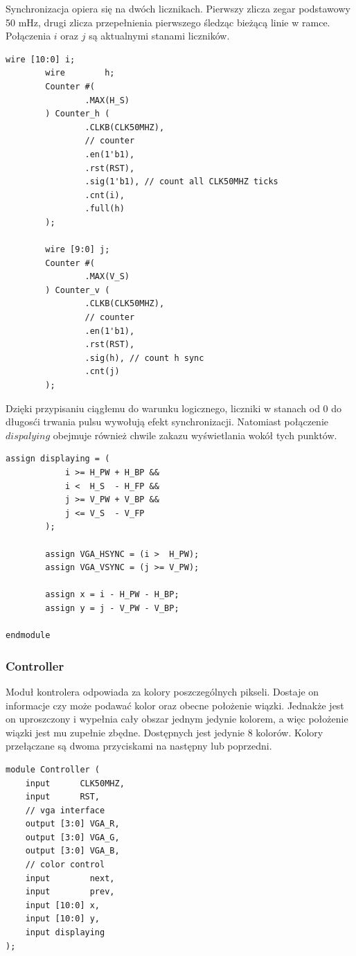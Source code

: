 \documentclass[a4paper,12pt]{article}
\begin{document}
Synchronizacja opiera się na dwóch licznikach. Pierwszy zlicza zegar podstawowy 50 mHz, drugi zlicza przepełnienia pierwszego śledząc bieżącą linie w ramce. Połączenia $i$ oraz $j$ są aktualnymi stanami liczników.
\begin{lstlisting}[label=Syncvga,caption=Sync.v,firstnumber=23]
        wire [10:0] i;
        wire        h;
        Counter #(
                .MAX(H_S)
        ) Counter_h (
                .CLKB(CLK50MHZ),
                // counter
                .en(1'b1),
                .rst(RST),
                .sig(1'b1), // count all CLK50MHZ ticks
                .cnt(i),
                .full(h)
        );

        wire [9:0] j;
        Counter #(
                .MAX(V_S)
        ) Counter_v (
                .CLKB(CLK50MHZ),
                // counter
                .en(1'b1),
                .rst(RST),
                .sig(h), // count h sync
                .cnt(j)
        );
\end{lstlisting}

Dzięki przypisaniu ciągłemu do warunku logicznego, liczniki w stanach od 0 do długosći trwania pulsu wywołują efekt synchronizacji. Natomiast połączenie $dispalying$ obejmuje również chwile zakazu wyświetlania wokół tych punktów.
\begin{lstlisting}[label=Syncvga,caption=Sync.v,firstnumber=49]
        assign displaying = (
            i >= H_PW + H_BP &&
            i <  H_S  - H_FP &&
            j >= V_PW + V_BP &&
            j <= V_S  - V_FP
        );

        assign VGA_HSYNC = (i >  H_PW);
        assign VGA_VSYNC = (j >= V_PW);

        assign x = i - H_PW - H_BP;
        assign y = j - V_PW - V_BP;

endmodule
\end{lstlisting}

\subsubsection{Controller}

Moduł kontrolera odpowiada za kolory poszczególnych pikseli. Dostaje on informacje czy może podawać kolor oraz obecne położenie wiązki. Jednakże jest on uproszczony i wypełnia cały obszar jednym jedynie kolorem, a więc  położenie wiązki jest mu zupełnie zbędne. Dostępnych jest jedynie 8 kolorów. Kolory przełączane są dwoma przyciskami na następny lub poprzedni.
\begin{lstlisting}[label=Syncvga,caption=Sync.v,firstnumber=49]
module Controller (
    input      CLK50MHZ,
    input      RST,
    // vga interface
    output [3:0] VGA_R,
    output [3:0] VGA_G,
    output [3:0] VGA_B,
    // color control
    input        next,
    input        prev,
    input [10:0] x,
    input [10:0] y,
    input displaying
);
\end{lstlisting}
\end{document}

